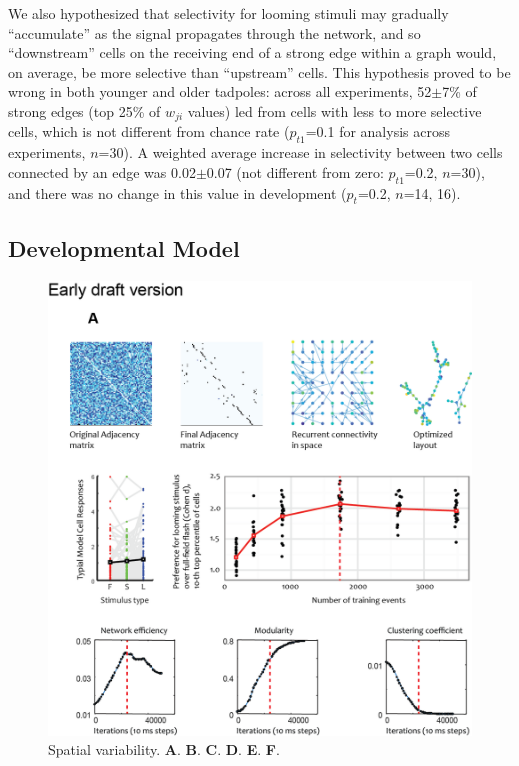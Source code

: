 \documentclass{article}
\begin{document}
We also hypothesized that selectivity for looming stimuli may gradually “accumulate” as the signal propagates through the network, and so “downstream” cells on the receiving end of a strong edge within a graph would, on average, be more selective than “upstream” cells. This hypothesis proved to be wrong in both younger and older tadpoles: across all experiments, 52$\pm$7\% of strong edges (top 25\% of $w_{ji}$ values) led from cells with less to more selective cells, which is not different from chance rate ($p_{t1}$=0.1 for analysis across experiments, $n$=30). A weighted average increase in selectivity between two cells connected by an edge was 0.02$\pm$0.07 (not different from zero: $p_{t1}$=0.2, $n$=30), and there was no change in this value in development ($p_t$=0.2, $n$=14, 16).

\subsection*{Developmental Model}

\begin{figure}[t!]
\includegraphics[width=\linewidth]{fig6.png}
\caption{
Spatial variability. \textbf{A}. \textbf{B}. \textbf{C}. \textbf{D}. \textbf{E}. \textbf{F}. }
\end{figure}
\end{document}

